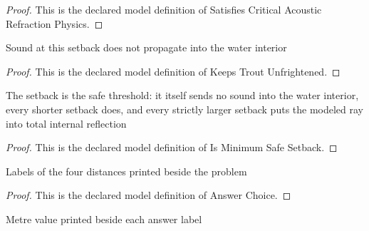 \begin{proof}
  This is the declared model definition of Satisfies Critical Acoustic Refraction Physics.
\end{proof}
\begin{definition}
  \label{def:physics:phyx-mini-0209:phyxminiproblems-problemphyxmini0209-keepstroutunfrightened}
  Sound at this setback does not propagate into the water interior
\end{definition}
\begin{proof}
  This is the declared model definition of Keeps Trout Unfrightened.
\end{proof}
\begin{definition}
  \label{def:physics:phyx-mini-0209:phyxminiproblems-problemphyxmini0209-isminimumsafesetback}
  The setback is the safe threshold: it itself sends no sound into the water interior, every shorter setback does, and every strictly larger setback puts the modeled ray into total internal reflection
\end{definition}
\begin{proof}
  This is the declared model definition of Is Minimum Safe Setback.
\end{proof}
\begin{definition}
  \label{def:physics:phyx-mini-0209:phyxminiproblems-problemphyxmini0209-answerchoice}
  Labels of the four distances printed beside the problem
\end{definition}
\begin{proof}
  This is the declared model definition of Answer Choice.
\end{proof}
\begin{definition}[meters]
  \label{def:physics:phyx-mini-0209:phyxminiproblems-problemphyxmini0209-answerchoice-meters}
  Metre value printed beside each answer label
\end{definition}
